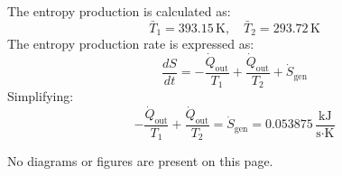 The entropy production is calculated as:  
\[
\bar{T}_1 = 393.15 \, \text{K}, \quad \bar{T}_2 = 293.72 \, \text{K}
\]  
The entropy production rate is expressed as:  
\[
\frac{dS}{dt} = -\frac{\dot{Q}_{\text{out}}}{T_1} + \frac{\dot{Q}_{\text{out}}}{T_2} + \dot{S}_{\text{gen}}
\]  
Simplifying:  
\[
-\frac{\dot{Q}_{\text{out}}}{T_1} + \frac{\dot{Q}_{\text{out}}}{T_2} = \dot{S}_{\text{gen}} = 0.053875 \, \frac{\text{kJ}}{\text{s·K}}
\]  

No diagrams or figures are present on this page.